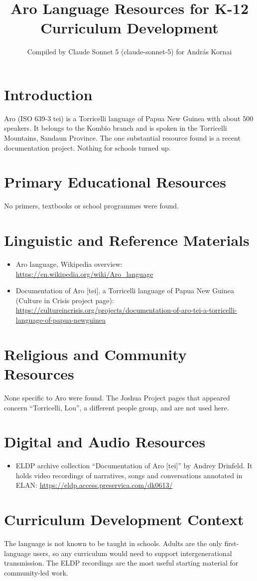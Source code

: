 \documentclass[12pt]{article}
\title{Aro Language Resources for K-12 Curriculum Development}
\author{Compiled by Claude Sonnet 5 (claude-sonnet-5) for Andr\'as Kornai}
\date{}
\begin{document}
\maketitle

\section{Introduction}
Aro (ISO 639-3 tei) is a Torricelli language of Papua New Guinea with about 500 speakers. It belongs to the Kombio branch and is spoken in the Torricelli Mountains, Sandaun Province. The one substantial resource found is a recent documentation project. Nothing for schools turned up.

\section{Primary Educational Resources}
No primers, textbooks or school programmes were found.

\section{Linguistic and Reference Materials}
\begin{itemize}
\item Aro language, Wikipedia overview: \url{https://en.wikipedia.org/wiki/Aro_language}
\item Documentation of Aro [tei], a Torricelli language of Papua New Guinea (Culture in Crisis project page): \url{https://cultureincrisis.org/projects/documentation-of-aro-tei-a-torricelli-language-of-papua-newguinea}
\end{itemize}

\section{Religious and Community Resources}
None specific to Aro were found. The Joshua Project pages that appeared concern ``Torricelli, Lou'', a different people group, and are not used here.

\section{Digital and Audio Resources}
\begin{itemize}
\item ELDP archive collection ``Documentation of Aro [tei]'' by Andrey Drinfeld. It holds video recordings of narratives, songs and conversations annotated in ELAN: \url{https://eldp.access.preservica.com/dk0613/}
\end{itemize}

\section{Curriculum Development Context}
The language is not known to be taught in schools. Adults are the only first-language users, so any curriculum would need to support intergenerational transmission. The ELDP recordings are the most useful starting material for community-led work.
\end{document}
